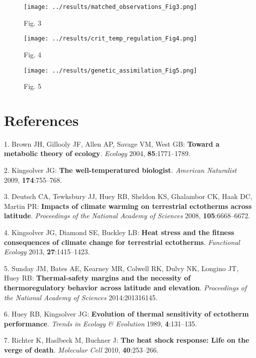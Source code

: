 \documentclass[]{article}
\begin{document}
\begin{figure}[htbp]
\centering
\texttt{[image: ../results/matched\_observations\_Fig3.png]}
\caption{Fig. 3}
\end{figure}

\begin{figure}[htbp]
\centering
\texttt{[image: ../results/crit\_temp\_regulation\_Fig4.png]}
\caption{Fig. 4}
\end{figure}

\begin{figure}[htbp]
\centering
\texttt{[image: ../results/genetic\_assimilation\_Fig5.png]}
\caption{Fig. 5}
\end{figure}

\newpage

\section*{References}\label{references}

1. Brown JH, Gillooly JF, Allen AP, Savage VM, West GB: \textbf{Toward a
metabolic theory of ecology}. \emph{Ecology} 2004,
\textbf{85}:1771--1789.

2. Kingsolver JG: \textbf{The well-temperatured biologist}.
\emph{American Naturalist} 2009, \textbf{174}:755--768.

3. Deutsch CA, Tewksbury JJ, Huey RB, Sheldon KS, Ghalambor CK, Haak DC,
Martin PR: \textbf{Impacts of climate warming on terrestrial ectotherms
across latitude}. \emph{Proceedings of the National Academy of Sciences}
2008, \textbf{105}:6668--6672.

4. Kingsolver JG, Diamond SE, Buckley LB: \textbf{Heat stress and the
fitness consequences of climate change for terrestrial ectotherms}.
\emph{Functional Ecology} 2013, \textbf{27}:1415--1423.

5. Sunday JM, Bates AE, Kearney MR, Colwell RK, Dulvy NK, Longino JT,
Huey RB: \textbf{Thermal-safety margins and the necessity of
thermoregulatory behavior across latitude and elevation}.
\emph{Proceedings of the National Academy of Sciences} 2014:201316145.

6. Huey RB, Kingsolver JG: \textbf{Evolution of thermal sensitivity of
ectotherm performance}. \emph{Trends in Ecology \& Evolution} 1989,
\textbf{4}:131--135.

7. Richter K, Haslbeck M, Buchner J: \textbf{The heat shock response:
Life on the verge of death}. \emph{Molecular Cell} 2010,
\textbf{40}:253--266.
\end{document}
